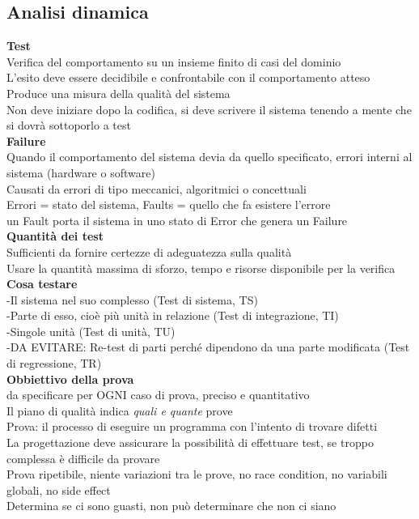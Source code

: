 \documentclass{article}
\begin{document}
				\subsection{Analisi dinamica}
				\textbf{Test}\\
				Verifica del comportamento su un insieme finito di casi del dominio\\
				L'esito deve essere decidibile e confrontabile con il comportamento atteso\\
				Produce una misura della qualità del sistema\\
				Non deve iniziare dopo la codifica, si deve scrivere il sistema tenendo a mente che si dovrà sottoporlo a test\\
				
				\textbf{Failure}\\
				Quando il comportamento del sistema devia da quello specificato, errori interni al sistema (hardware o software)\\
				Causati da errori di tipo meccanici, algoritmici o concettuali\\
				Errori = stato del sistema, Faults = quello che fa esistere l'errore\\
				un Fault porta il sistema in uno stato di Error che genera un Failure\\
				
				\textbf{Quantità dei test}\\
				Sufficienti da fornire certezze di adeguatezza sulla qualità\\
				Usare la quantità massima di sforzo, tempo e risorse disponibile per la verifica\\
				
				\textbf{Cosa testare}\\
				-Il sistema nel suo complesso (Test di sistema, TS)\\
				-Parte di esso, cioè più unità in relazione (Test di integrazione, TI)\\
				-Singole unità (Test di unità, TU)\\
				-DA EVITARE: Re-test di parti perché dipendono da una parte modificata (Test di regressione, TR)\\
				
				\textbf{Obbiettivo della prova}\\
				da specificare per OGNI caso di prova, preciso e quantitativo\\
				Il piano di qualità indica \textit{quali e quante} prove\\
				Prova: il processo di eseguire un programma con l'intento di trovare difetti\\
				La progettazione deve assicurare la possibilità di effettuare test, se troppo complessa è difficile da provare\\
				Prova ripetibile, niente variazioni tra le prove, no race condition, no variabili globali, no side effect\\
				Determina se ci sono guasti, non può determinare che non ci siano\\
				
\end{document}
